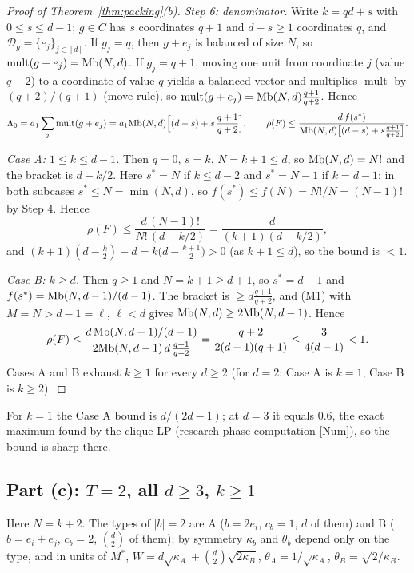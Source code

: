 \documentclass[11pt]{article}
\newcommand{\mult}{\operatorname{mult}}
\theoremstyle{definition}
\theoremstyle{remark}
\begin{document}
\begin{proof}[Proof of Theorem~\ref{thm:packing}(b)]
\emph{Step 6: denominator.} Write $k=qd+s$ with $0\le s\le d-1$; $g\in C$ has $s$ coordinates $q+1$ and $d-s\ge1$ coordinates $q$, and $\mathcal D_g=\{e_j\}_{j\in[d]}$.
If $g_j=q$, then $g+e_j$ is balanced of size $N$, so $\mult(g+e_j)=\Mb(N,d)$. If $g_j=q+1$, moving one unit from coordinate $j$ (value $q+2$) to a
coordinate of value $q$ yields a balanced vector and multiplies $\mult$ by $(q+2)/(q+1)$ (move rule), so $\mult(g+e_j)=\Mb(N,d)\frac{q+1}{q+2}$. Hence
\[
\Lambda_0=a_1\sum_j\mult(g+e_j)=a_1\Mb(N,d)\Big[(d-s)+s\,\frac{q+1}{q+2}\Big],\qquad
\rho(F)\le\frac{d\,f(s^\ast)}{\Mb(N,d)\big[(d-s)+s\frac{q+1}{q+2}\big]} .
\]

\emph{Case A: $1\le k\le d-1$.} Then $q=0$, $s=k$, $N=k+1\le d$, so $\mathrm{Mb}(N,d)=N!$ and the bracket is $d-k/2$. Here $s^\ast=N$ if $k\le d-2$ and
$s^\ast=N-1$ if $k=d-1$; in both subcases $s^\ast\le N=\min(N,d)$, so $f(s^\ast)\le f(N)=N!/N=(N-1)!$ by Step 4. Hence
\[
\rho(F)\le\frac{d\,(N-1)!}{N!\,(d-k/2)}=\frac{d}{(k+1)(d-k/2)},
\]
and $(k+1)(d-\frac k2)-d=k\big(d-\frac{k+1}2\big)>0$ (as $k+1\le d$), so the bound is $<1$.

\emph{Case B: $k\ge d$.} Then $q\ge1$ and $N=k+1\ge d+1$, so $s^\ast=d-1$ and $f(s^\ast)=\mathrm{Mb}(N,d-1)/(d-1)$. The bracket is
$\ge d\frac{q+1}{q+2}$, and (M1) with $M=N>d-1=\ell$, $\ell<d$ gives $\mathrm{Mb}(N,d)\ge2\mathrm{Mb}(N,d-1)$. Hence
\[
\rho(F)\le\frac{d\,\mathrm{Mb}(N,d-1)/(d-1)}{2\mathrm{Mb}(N,d-1)\,d\,\frac{q+1}{q+2}}=\frac{q+2}{2(d-1)(q+1)}\le\frac{3}{4(d-1)}<1 .
\]
Cases A and B exhaust $k\ge1$ for every $d\ge2$ (for $d=2$: Case A is $k=1$, Case B is $k\ge2$).
\end{proof}
For $k=1$ the Case A bound is $d/(2d-1)$; at $d=3$ it equals $0.6$, the exact maximum found by the clique LP (research-phase computation
[Num]), so the bound is sharp there.

\subsection{Part (c): \texorpdfstring{$T=2$}{T=2}, all \texorpdfstring{$d\ge3$}{d>=3}, \texorpdfstring{$k\ge1$}{k>=1}}\label{app:T2}
Here $N=k+2$. The types of $|b|=2$ are A ($b=2e_i$, $c_b=1$, $d$ of them) and B ($b=e_i+e_j$, $c_b=2$, $\binom d2$ of them); by symmetry
$\kappa_b$ and $\theta_b$ depend only on the type, and in units of $M^\ast$, $W=d\sqrt{\kappa_A}+\binom d2\sqrt{2\kappa_B}$, $\theta_A=1/\sqrt{\kappa_A}$,
$\theta_B=\sqrt{2/\kappa_B}$.
\end{document}
